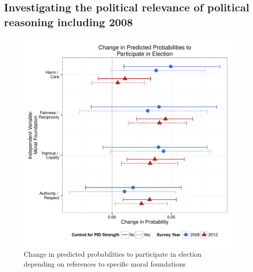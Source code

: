 \documentclass[12pt]{article}
\begin{document}
\subsection{Investigating the political relevance of political reasoning including 2008}

\begin{figure}\centering
\includegraphics[scale=.4]{../calc/fig/appD9turnout.pdf}
\caption{Change in predicted probabilities to participate in election depending on references to specific moral foundations}\label{fig:appD9turnout}
\end{figure}
\end{document}
